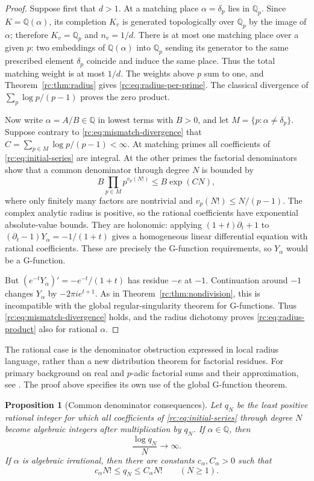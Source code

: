 \documentclass[11pt,a4paper]{article}
\newtheorem{proposition}[theorem]{Proposition}
\theoremstyle{definition}
\theoremstyle{remark}
\theoremstyle{plain}
\numberwithin{equation}{section}
\providecommand{\rcQ}{\mathbb Q}
\begin{document}
\begin{proof}
Suppose first that $d>1$.  At a matching place $\alpha=\delta_p$
lies in $\rcQ_p$.  Since $K=\rcQ(\alpha)$, its completion $K_v$ is
generated topologically over $\rcQ_p$ by the image of $\alpha$;
therefore $K_v=\rcQ_p$ and $n_v=1/d$.  There is at most one matching
place over a given $p$: two embeddings of $\rcQ(\alpha)$ into
$\rcQ_p$ sending its generator to the same prescribed element
$\delta_p$ coincide and induce the same place.  Thus the total
matching weight is at most $1/d$.  The weights above $p$ sum to one,
and Theorem~\ref{rc:thm:radius} gives
\eqref{rc:eq:radius-per-prime}.  The classical divergence of
$\sum_p\log p/(p-1)$ proves the zero product.

Now write $\alpha=A/B\in\rcQ$ in lowest terms with $B>0$, and let
$M=\{p:\alpha\ne\delta_p\}$.  Suppose contrary to
\eqref{rc:eq:mismatch-divergence} that
$C=\sum_{p\in M}\log p/(p-1)<\infty$.  At matching primes all
coefficients of \eqref{rc:eq:initial-series} are integral.  At the other
primes the factorial denominators show that a common denominator through
degree $N$ is bounded by
\[
 B\prod_{p\in M}p^{v_p(N!)}\le B\exp(CN),
\]
where only finitely many factors are nontrivial and
$v_p(N!)\le N/(p-1)$.  The complex analytic radius is positive, so
the rational coefficients have exponential absolute-value bounds.
They are holonomic: applying $(1+t)\partial_t+1$ to
$(\partial_t-1)Y_\alpha=-1/(1+t)$ gives a homogeneous linear
differential equation with rational coefficients.  These are precisely
the G-function requirements, so $Y_\alpha$ would be a G-function.

But $(e^{-t}Y_\alpha)'=-e^{-t}/(1+t)$ has residue $-e$ at $-1$.
Continuation around $-1$ changes $Y_\alpha$ by $-2\pi i e^{t+1}$.
As in Theorem~\ref{rc:thm:nondivision}, this is incompatible with the
global regular-singularity theorem for G-functions.  Thus
\eqref{rc:eq:mismatch-divergence} holds, and the radius dichotomy proves
\eqref{rc:eq:radius-product} also for rational $\alpha$.
\end{proof}

The rational case is the denominator obstruction expressed in local
radius language, rather than a new distribution theorem for factorial
residues.  For primary background on real and $p$-adic factorial sums
and their approximation, see \cite{rc:ernvall-hytonen}.  The proof above
specifies its own use of the global G-function theorem.

\begin{proposition}[Common denominator consequences]\label{rc:prop:denominators}
Let $q_N$ be the least positive rational integer for which all
coefficients of \eqref{rc:eq:initial-series} through degree $N$ become
algebraic integers after multiplication by $q_N$.  If $\alpha\in\rcQ$,
then
\[
 \frac{\log q_N}{N}\longrightarrow\infty.
\]
If $\alpha$ is algebraic irrational, then there are constants
$c_\alpha,C_\alpha>0$ such that
\[
 c_\alpha N!\le q_N\le C_\alpha N!\qquad(N\ge1).
\]
\end{proposition}
\end{document}
